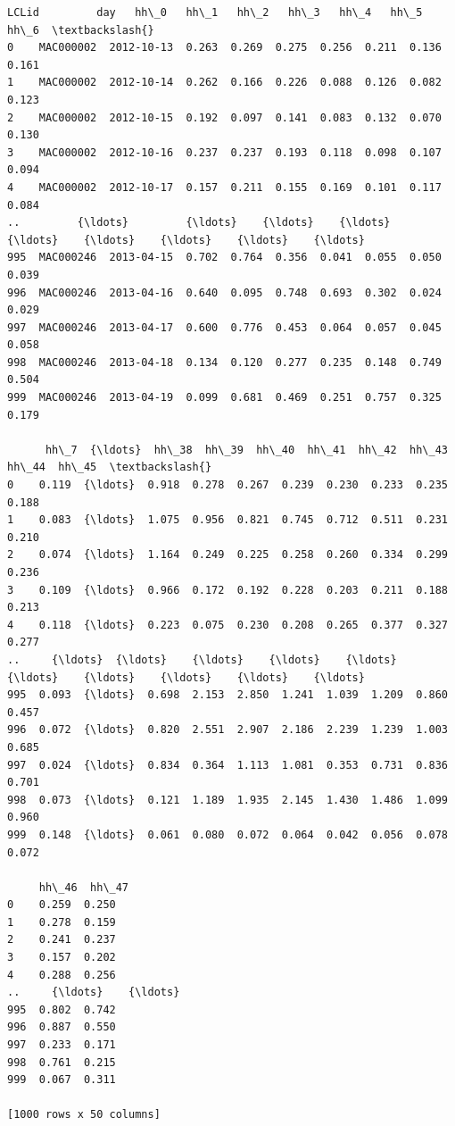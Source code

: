 \documentclass[11pt]{article}
\makeatletter
\newcommand{\boxspacing}{\kern\kvtcb@left@rule\kern\kvtcb@boxsep}
\newcommand{\prompt}[4]{
        {\ttfamily\llap{{\color{#2}[#3]:\hspace{3pt}#4}}\vspace{-\baselineskip}}
    }
\makeatother
\begin{document}
            \begin{tcolorbox}[breakable, size=fbox, boxrule=.5pt, pad at break*=1mm, opacityfill=0]
\prompt{Out}{outcolor}{54}{\boxspacing}
\begin{Verbatim}[commandchars=\\\{\}]
         LCLid         day   hh\_0   hh\_1   hh\_2   hh\_3   hh\_4   hh\_5   hh\_6  \textbackslash{}
0    MAC000002  2012-10-13  0.263  0.269  0.275  0.256  0.211  0.136  0.161
1    MAC000002  2012-10-14  0.262  0.166  0.226  0.088  0.126  0.082  0.123
2    MAC000002  2012-10-15  0.192  0.097  0.141  0.083  0.132  0.070  0.130
3    MAC000002  2012-10-16  0.237  0.237  0.193  0.118  0.098  0.107  0.094
4    MAC000002  2012-10-17  0.157  0.211  0.155  0.169  0.101  0.117  0.084
..         {\ldots}         {\ldots}    {\ldots}    {\ldots}    {\ldots}    {\ldots}    {\ldots}    {\ldots}    {\ldots}
995  MAC000246  2013-04-15  0.702  0.764  0.356  0.041  0.055  0.050  0.039
996  MAC000246  2013-04-16  0.640  0.095  0.748  0.693  0.302  0.024  0.029
997  MAC000246  2013-04-17  0.600  0.776  0.453  0.064  0.057  0.045  0.058
998  MAC000246  2013-04-18  0.134  0.120  0.277  0.235  0.148  0.749  0.504
999  MAC000246  2013-04-19  0.099  0.681  0.469  0.251  0.757  0.325  0.179

      hh\_7  {\ldots}  hh\_38  hh\_39  hh\_40  hh\_41  hh\_42  hh\_43  hh\_44  hh\_45  \textbackslash{}
0    0.119  {\ldots}  0.918  0.278  0.267  0.239  0.230  0.233  0.235  0.188
1    0.083  {\ldots}  1.075  0.956  0.821  0.745  0.712  0.511  0.231  0.210
2    0.074  {\ldots}  1.164  0.249  0.225  0.258  0.260  0.334  0.299  0.236
3    0.109  {\ldots}  0.966  0.172  0.192  0.228  0.203  0.211  0.188  0.213
4    0.118  {\ldots}  0.223  0.075  0.230  0.208  0.265  0.377  0.327  0.277
..     {\ldots}  {\ldots}    {\ldots}    {\ldots}    {\ldots}    {\ldots}    {\ldots}    {\ldots}    {\ldots}    {\ldots}
995  0.093  {\ldots}  0.698  2.153  2.850  1.241  1.039  1.209  0.860  0.457
996  0.072  {\ldots}  0.820  2.551  2.907  2.186  2.239  1.239  1.003  0.685
997  0.024  {\ldots}  0.834  0.364  1.113  1.081  0.353  0.731  0.836  0.701
998  0.073  {\ldots}  0.121  1.189  1.935  2.145  1.430  1.486  1.099  0.960
999  0.148  {\ldots}  0.061  0.080  0.072  0.064  0.042  0.056  0.078  0.072

     hh\_46  hh\_47
0    0.259  0.250
1    0.278  0.159
2    0.241  0.237
3    0.157  0.202
4    0.288  0.256
..     {\ldots}    {\ldots}
995  0.802  0.742
996  0.887  0.550
997  0.233  0.171
998  0.761  0.215
999  0.067  0.311

[1000 rows x 50 columns]
\end{Verbatim}
\end{tcolorbox}
        
\end{document}

